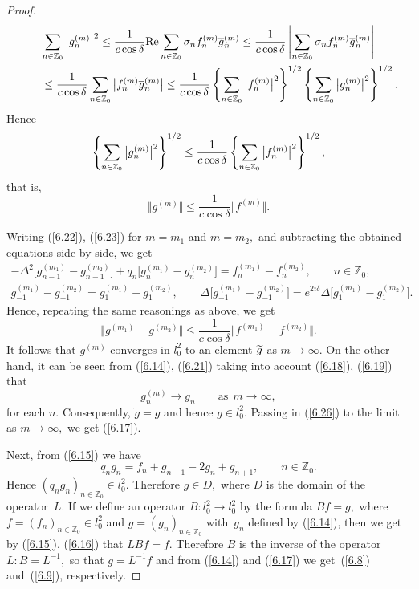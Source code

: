 \begin{proof}
\begin{gather*}
\sum_{n\in
\mathbb{Z}
_{0}}\big\vert g_{n}^{(m)}\big\vert ^{2}\leq \frac{1}{c\cos \delta }%
{\rm Re}\sum_{n\in
\mathbb{Z}
_{0}}\sigma _{n}f_{n}^{(m)}\overline{g}_{n}^{(m)}
\leq \frac{1}{c\cos \delta }\left\vert \sum_{n\in
\mathbb{Z}
_{0}}\sigma _{n}f_{n}^{(m)}\overline{g}_{n}^{(m)}\right\vert \\
\qquad {} \leq \frac{1}{%
c\cos \delta }\sum_{n\in
\mathbb{Z}
_{0}}\big\vert f_{n}^{(m)}\overline{g}_{n}^{(m)}\big\vert
\leq \frac{1}{c\cos \delta }\left\{ \sum_{n\in
\mathbb{Z}
_{0}}\big\vert f_{n}^{(m)}\big\vert ^{2}\right\} ^{1/2}\left\{ \sum_{n\in
\mathbb{Z}
_{0}}\big\vert g_{n}^{(m)}\big\vert ^{2}\right\} ^{1/2}.
\end{gather*}
Hence%
\[
\left\{ \sum_{n\in
\mathbb{Z}
_{0}}\big\vert g_{n}^{(m)}\big\vert ^{2}\right\} ^{1/2}\leq \frac{1}{%
c\cos \delta }\left\{ \sum_{n\in
\mathbb{Z}
_{0}}\big\vert f_{n}^{(m)}\big\vert ^{2}\right\} ^{1/2},
\]%
that is,%
\begin{equation}
\big\Vert g^{(m)}\big\Vert \leq \frac{1}{c\cos \delta }\big\Vert
f^{(m)}\big\Vert .  \label{6.26}
\end{equation}

Writing (\ref{6.22}), (\ref{6.23}) for $m=m_{1}$ and $m=m_{2},$ and
subtracting the obtained equations side-by-side, we get%
\begin{gather*}
-\Delta
^{2}\big[g_{n-1}^{(m_{1})}-g_{n-1}^{(m_{2})}\big]+q_{n}\big[g_{n}^{(m_{1})}-g_{n}^{(m_{2})}\big]=f_{n}^{(m_{1})}-f_{n}^{(m_{2})},%
\qquad n\in
\mathbb{Z}
_{0},
\\
g_{-1}^{(m_{1})}-g_{-1}^{(m_{2})}=g_{1}^{(m_{1})}-g_{1}^{(m_{2})},\qquad \Delta \big[ g_{-1}^{(m_{1})}-g_{-1}^{(m_{2})}\big]=e^{2i\delta }\Delta
\big[ g_{1}^{(m_{1})}-g_{1}^{(m_{2})}\big].
\end{gather*}
Hence, repeating the same reasonings as above, we get%
\[
\big\Vert g^{(m_{1})}-g^{(m_{2})}\big\Vert \leq \frac{1}{c\cos \delta }%
\big\Vert f^{(m_{1})}-f^{(m_{2})}\big\Vert .
\]%
It follows that $g^{(m)}$ converges in $l_{0}^{2}$ to an element $\widetilde{%
g}$ as $m\rightarrow \infty .$ On the other hand, it can be seen from (\ref{6.14}), (\ref{6.21}) taking into account (\ref{6.18}), (\ref{6.19}) that%
\[
g_{n}^{(m)}\rightarrow g_{n}\qquad \text{as} \ \ m\rightarrow \infty ,
\]%
for each $n$. Consequently, $\widetilde{g}=g$ and hence $g\in l_{0}^{2}.$
Passing in (\ref{6.26}) to the limit as $m\rightarrow \infty ,$ we get (\ref{6.17}).

Next, from (\ref{6.15}) we have%
\[
q_{n}g_{n}=f_{n}+g_{n-1}-2g_{n}+g_{n+1},\qquad n\in
\mathbb{Z}
_{0}.
\]
Hence $(q_{n}g_{n})_{n\in
\mathbb{Z}
_{0}}\in l_{0}^{2}.$ Therefore $g\in D,$ where $D$ is the domain of the
operator~$L$. If we def\/ine an operator $B:l_{0}^{2}\rightarrow l_{0}^{2}$ by
the formula $Bf=g,$ where $f=(f_{n})_{n\in
\mathbb{Z}
_{0}}\in l_{0}^{2}$ and $g=(g_{n})_{n\in
\mathbb{Z}
_{0}}$ with~$g_{n}$ def\/ined by (\ref{6.14}), then we get by (\ref{6.15}), (\ref{6.16}) that $LBf=f.$ Therefore $B$ is the inverse of the operator $%
L:B=L^{-1},$ so that $g=L^{-1}f$ and from (\ref{6.14}) and (\ref{6.17}) we
get~(\ref{6.8}) and~(\ref{6.9}), respectively.
\end{proof}

